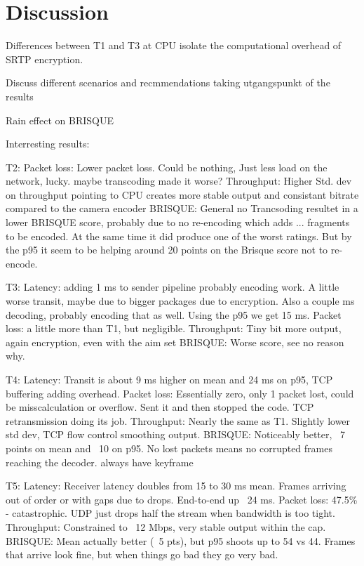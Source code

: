 \section{Discussion}\label{sec:discussion}

Differences between T1 and T3 at CPU isolate the computational overhead of SRTP encryption.

Discuss different scenarios and recmmendations taking utgangspunkt of the results

Rain effect on BRISQUE

Interresting results:

T2:
Packet loss: Lower packet loss. Could be nothing, Just less load on the network, lucky. maybe transcoding made it worse?
Throughput: Higher Std. dev on throughput pointing to CPU creates more stable output and consistant bitrate compared to the camera encoder
BRISQUE: General no Trancsoding resultet in a lower BRISQUE score, probably due to no re-encoding which adds ... fragments to be encoded. At the same time it did produce one of the worst ratings. But by the p95 it seem to be helping around 20 points on the Brisque score not to re-encode.

T3:
Latency: adding 1 ms to sender pipeline probably encoding work. A little worse transit, maybe due to bigger packages due to encryption. Also a couple ms decoding, probably encoding that as well. Using the p95 we get 15 ms.
Packet loss: a little more than T1, but negligible. 
Throughput: Tiny bit more output, again encryption, even with the aim set
BRISQUE: Worse score, see no reason why.

T4:
Latency: Transit is about 9 ms higher on mean and 24 ms on p95, TCP buffering adding overhead.
Packet loss: Essentially zero, only 1 packet lost, could be misscalculation or overflow. Sent it and then stopped the code. TCP retransmission doing its job.
Throughput: Nearly the same as T1. Slightly lower std dev, TCP flow control smoothing output.
BRISQUE: Noticeably better, ~7 points on mean and ~10 on p95. No lost packets means no corrupted frames reaching the decoder. always have keyframe

T5:
Latency: Receiver latency doubles from 15 to 30 ms mean. Frames arriving out of order or with gaps due to drops. End-to-end up ~24 ms.
Packet loss: 47.5\% - catastrophic. UDP just drops half the stream when bandwidth is too tight.
Throughput: Constrained to ~12 Mbps, very stable output within the cap.
BRISQUE: Mean actually better (~5 pts), but p95 shoots up to 54 vs 44. Frames that arrive look fine, but when things go bad they go very bad.

